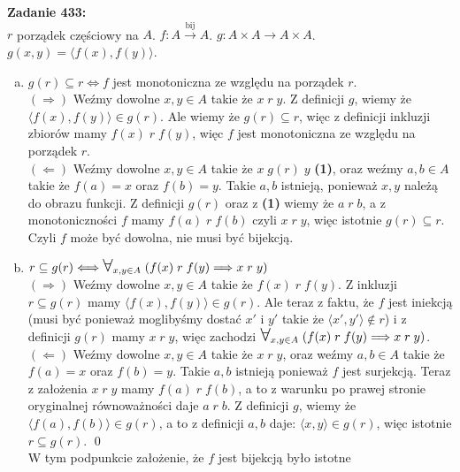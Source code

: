 \documentclass[10pt]{article}
\newcommand{\Forall}{{\Large\mbox{$\forall$}}}
\begin{document}
\textbf{Zadanie 433:} \\[10pt]
$r$ porządek częściowy na $A$. $f \colon A \xrightarrow{\text{bij}} A$. $g \colon A \times A \to A \times A$. $g(x, y) = \langle f(x), f(y) \rangle$.
\begin{enumerate}[(a)]
    \item $g(r) \subseteq r \Longleftrightarrow f$ jest monotoniczna ze względu na porządek $r$. \\[10pt]
    $(\Longrightarrow)$ Weźmy dowolne $x, y \in A$ takie że $x \; r \; y$. Z definicji $g$, wiemy że $\langle f(x), f(y) \rangle \in g(r)$. Ale wiemy że $g(r) \subseteq r$, więc z definicji inkluzji zbiorów mamy $f(x) \; r \; f(y)$, więc $f$ jest monotoniczna ze względu na porządek $r$. \\[10pt]
    $(\Longleftarrow)$ Weźmy dowolne $x, y \in A$ takie że $x \; g(r) \; y$ \textbf{(1)}, oraz weźmy $a, b \in A$ takie że $f(a) = x$ oraz $f(b) = y$. Takie $a, b$ istnieją, ponieważ $x, y$ należą do obrazu funkcji. Z definicji $g(r)$ oraz z \textbf{(1)} wiemy że $a \; r \; b$, a z monotoniczności $f$ mamy $f(a) \; r \; f(b)$ czyli $x \; r \; y$, więc istotnie $g(r) \subseteq r$. \\[5pt]
    Czyli $f$ może być dowolna, nie musi być bijekcją.
    
    \item $r \subseteq g(r) \Longleftrightarrow \Forall_{x, y \in A} \; (f(x) \; r \; f(y) \Longrightarrow x \; r \; y)$ \\[10pt]
    $(\Longrightarrow)$ Weźmy dowolne $x, y \in A$ takie że $f(x) \; r \; f(y)$. Z inkluzji $r \subseteq g(r)$ mamy $\langle f(x), f(y) \rangle \in g(r)$. Ale teraz z faktu, że $f$ jest iniekcją (musi być ponieważ moglibyśmy dostać $x'$ i $y'$ takie że $\langle x', y' \rangle \notin r$) i z definicji $g(r)$ mamy $x \; r \; y$, więc zachodzi $\Forall_{x, y \in A} \; (f(x) \; r \; f(y) \Longrightarrow x \; r \; y)$.  \\[10pt]
    $(\Longleftarrow)$ Weźmy dowolne $x, y \in A$ takie że $x \; r \; y$, oraz weźmy $a, b \in A$ takie że $f(a) = x$ oraz $f(b) = y$. Takie $a, b$ istnieją  ponieważ $f$ jest surjekcją. Teraz z założenia $x \; r \; y$ mamy $f(a) \; r \; f(b)$, a to z warunku po prawej stronie oryginalnej równoważności daje $a \; r \; b$. Z definicji $g$, wiemy że $\langle f(a), f(b) \rangle \in g(r)$, a to z definicji $a, b$ daje: $\langle x, y \rangle \in g(r)$, więc istotnie $r \subseteq g(r)$. \qed \\[5pt]
    W tym podpunkcie założenie, że $f$ jest bijekcją było istotne
    
    
\end{enumerate}
\end{document}
